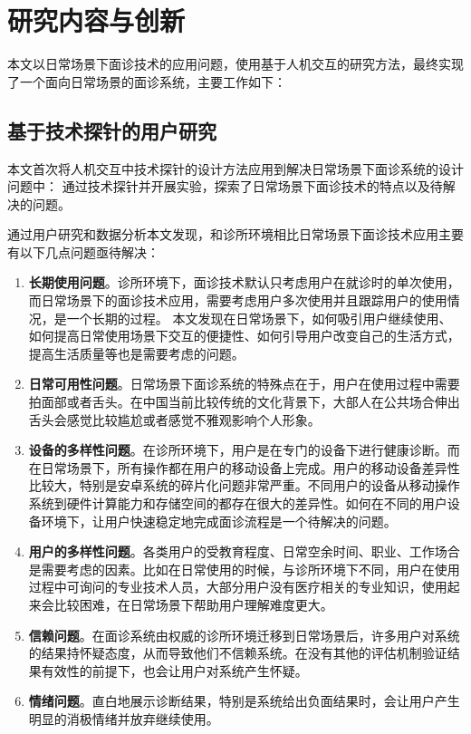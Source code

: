 \section{研究内容与创新}

本文以日常场景下面诊技术的应用问题，使用基于人机交互的研究方法，最终实现了一个面向日常场景的面诊系统，主要工作如下：

\subsection{基于技术探针的用户研究}

本文首次将人机交互中技术探针的设计方法应用到解决日常场景下面诊系统的设计问题中：
通过技术探针并开展实验，探索了日常场景下面诊技术的特点以及待解决的问题。

通过用户研究和数据分析本文发现，和诊所环境相比日常场景下面诊技术应用主要有以下几点问题亟待解决：
\begin{enumerate}
    \item \textbf{长期使用问题}。诊所环境下，面诊技术默认只考虑用户在就诊时的单次使用，而日常场景下的面诊技术应用，需要考虑用户多次使用并且跟踪用户的使用情况，是一个长期的过程。
    本文发现在日常场景下，如何吸引用户继续使用、如何提高日常使用场景下交互的便捷性、如何引导用户改变自己的生活方式，提高生活质量等也是需要考虑的问题。
    
    \item \textbf{日常可用性问题}。日常场景下面诊系统的特殊点在于，用户在使用过程中需要拍面部或者舌头。在中国当前比较传统的文化背景下，大部人在公共场合伸出舌头会感觉比较尴尬或者感觉不雅观影响个人形象。

    \item \textbf{设备的多样性问题}。在诊所环境下，用户是在专门的设备下进行健康诊断。而在日常场景下，所有操作都在用户的移动设备上完成。用户的移动设备差异性比较大，特别是安卓系统的碎片化问题非常严重。不同用户的设备从移动操作系统到硬件计算能力和存储空间的都存在很大的差异性。如何在不同的用户设备环境下，让用户快速稳定地完成面诊流程是一个待解决的问题。
    
    \item \textbf{用户的多样性问题}。各类用户的受教育程度、日常空余时间、职业、工作场合是需要考虑的因素。比如在日常使用的时候，与诊所环境下不同，用户在使用过程中可询问的专业技术人员，大部分用户没有医疗相关的专业知识，使用起来会比较困难，在日常场景下帮助用户理解难度更大。
        
    \item \textbf{信赖问题}。在面诊系统由权威的诊所环境迁移到日常场景后，许多用户对系统的结果持怀疑态度，从而导致他们不信赖系统。在没有其他的评估机制验证结果有效性的前提下，也会让用户对系统产生怀疑。
    
    \item \textbf{情绪问题}。直白地展示诊断结果，特别是系统给出负面结果时，会让用户产生明显的消极情绪并放弃继续使用。
\end{enumerate}

